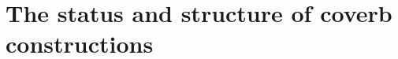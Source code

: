 \documentclass[../main.tex]{subfiles}
\begin{document}
\section{The status and structure of coverb constructions}
\end{document}
